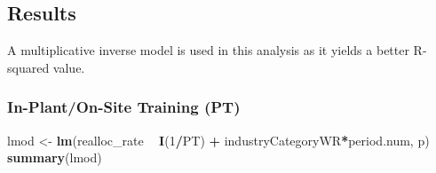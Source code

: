 \documentclass[
]{article}
\newenvironment{Shaded}{\begin{snugshade}}{\end{snugshade}}
\newcommand{\DecValTok}[1]{\textcolor[rgb]{0.00,0.00,0.81}{#1}}
\newcommand{\KeywordTok}[1]{\textcolor[rgb]{0.13,0.29,0.53}{\textbf{#1}}}
\newcommand{\NormalTok}[1]{#1}
\newcommand{\OperatorTok}[1]{\textcolor[rgb]{0.81,0.36,0.00}{\textbf{#1}}}
\newcommand{\StringTok}[1]{\textcolor[rgb]{0.31,0.60,0.02}{#1}}
\begin{document}
\hypertarget{results-1}{%
\subsection{Results}\label{results-1}}

A multiplicative inverse model is used in this analysis as it yields a
better R-squared value.

\hypertarget{in-planton-site-training-pt-1}{%
\subsubsection{In-Plant/On-Site Training
(PT)}\label{in-planton-site-training-pt-1}}

\begin{Shaded}
\begin{Highlighting}[]
\NormalTok{lmod <-}\StringTok{ }\KeywordTok{lm}\NormalTok{(realloc_rate }\OperatorTok{~}\StringTok{ }\KeywordTok{I}\NormalTok{(}\DecValTok{1}\OperatorTok{/}\NormalTok{PT) }\OperatorTok{+}\StringTok{ }\NormalTok{industryCategoryWR}\OperatorTok{*}\NormalTok{period.num, p)}
\KeywordTok{summary}\NormalTok{(lmod)}
\end{Highlighting}
\end{Shaded}
\end{document}
